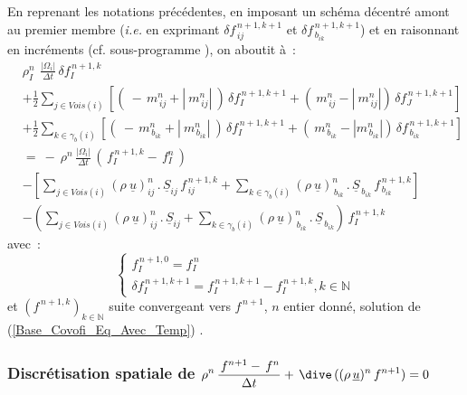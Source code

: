 En reprenant les notations précédentes, en imposant un schéma décentré
amont au premier membre ({\it i.e.} en exprimant $\delta f_{\,ij}^{\,n+1,k+1}$ et
$\delta f_{\,{b}_{ik}}^{\,n+1,k+1}$) et en raisonnant en incréments
(cf. sous-programme ), on aboutit à~:
\begin{equation}
\begin{array}{lll}
&\rho_I^n\,\displaystyle\ \frac{|\Omega_i|}{\Delta
t}\,\delta f_I^{\,n+1,k}\\
& +\displaystyle\frac{1}{2}\sum\limits_{j\in Vois(i)}\left[(\
-\,m_{\,ij}^n + |\ m_{\,ij}^n|\ )\,\delta f_I^{\,n+1,k+1}+ (\ m_{\,ij}^n - |\ m_{\,ij}^n|)\,\delta f_J^{\,n+1,k+1}\right]\\
&+\displaystyle\frac{1}{2}\sum\limits_{k\in {\gamma_b(i)}}\left[(\ -\,
m_{\,{b}_{ik}}^n + |\ m_{\,{b}_{ik}}^n|\ )\,\delta f_I^{\,n+1,k+1} + (\
m_{\,{b}_{ik}}^n - |m_{\,{b}_{ik}}^n|)\,\delta
f_{\,{b}_{ik}}^{\,n+1,k+1}\right]\\
& =\ -\ \displaystyle \rho^n \,\frac {|\Omega_i| }{\Delta t}\,(\,f_I^{\,n+1,k}
-\,f_I^n\,)\\
& - \left[\sum\limits_{j\in Vois(i)} (\rho\ \underline{u})^{n}_{ij}\,.\,\underline{S}_{ij}\, f^{\,n+1,k}_{\,ij}+\sum\limits_{k\in {\gamma_b(i)}} (\rho\
\underline{u})^{n}_{\,b_{ik}}\,.\,\underline{S}_{\,b_{ik}}\,f^{\,n+1,k}_{\,{b_{ik}}}\right]\\
&-\left(\sum\limits_{j\in Vois(i)} (\rho\ \underline{u})^{n}_{ij}\,.\,\underline{S}_{ij}+\sum\limits_{k\in {\gamma_b(i)}} (\rho\
\underline{u})^{n}_{\,b_{ik}}\,.\,\underline{S}_{\,b_{ik}}\right)\,f_I^{\,n+1,k}
\end{array}
\end{equation}
avec~:
\begin{equation}
\left\{\begin{array}{ll}
f_I^{\,n+1,0} = f_I^{\,n}\\
\delta f_I^{\,n+1,k+1} = f_I^{\,n+1,k+1} - f_I^{\,n+1,k},{\text {$k\in \mathbb{N}$}}
\end{array}\right.
\end{equation}
et $(f^{\,n+1,k})_{k\in \mathbb{N}}$ suite convergeant vers  $f^{\,n+1}$, $n$
entier donné, solution de (\ref{Base_Covofi_Eq_Avec_Temp}) .\\

 \newpage
\subsubsection* {Discrétisation spatiale de
 $ \displaystyle \rho^n \,\frac {\,f^{n+1} -\,f^n}{\Delta t} +\,\dive\,((\rho\,\underline{u})^n\,f^{n+1}) = 0$}

